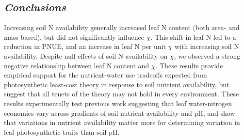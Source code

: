 \subsection{\textit{Conclusions}}
Increasing soil N availability generally increased leaf N content (both area- and mass-based), but did not significantly influence $\chi$. This shift in leaf N led to a reduction in PNUE, and an increase in leaf N per unit $\chi$ with increasing soil N availability. Despite null effects of soil N availability on $\chi$, we observed a strong negative relationship between leaf N content and $\chi$. These results provide empirical support for the nutrient-water use tradeoffs expected from photosynthetic least-cost theory in response to soil nutrient availability, but suggest that all tenets of the theory may not hold in every environment. These results experimentally test previous work suggesting that leaf water-nitrogen economies vary across gradients of soil nutrient availability and pH, and show that variations in nutrient availability matter more for determining variation in leaf photosynthetic traits than soil pH.
